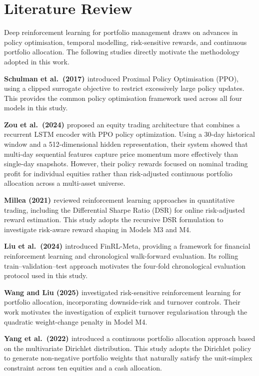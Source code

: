 \chapter{Literature Review}
\label{ch:lit_review}

Deep reinforcement learning for portfolio management draws on advances in policy optimisation, temporal modelling, risk-sensitive rewards, and continuous portfolio allocation. The following studies directly motivate the methodology adopted in this work.

\noindent\textbf{Schulman et al.\ (2017) \citep{schulman2017proximal}} introduced Proximal Policy Optimisation (PPO), using a clipped surrogate objective to restrict excessively large policy updates. This provides the common policy optimisation framework used across all four models in this study.

\noindent\textbf{Zou et al.\ (2024) \citep{zou2024novel}} proposed an equity trading architecture that combines a recurrent LSTM encoder with PPO policy optimization. Using a 30-day historical window and a 512-dimensional hidden representation, their system showed that multi-day sequential features capture price momentum more effectively than single-day snapshots. However, their policy rewards focused on nominal trading profit for individual equities rather than risk-adjusted continuous portfolio allocation across a multi-asset universe.

\noindent\textbf{Millea (2021) \citep{millea2021deep}} reviewed reinforcement learning approaches in quantitative trading, including the Differential Sharpe Ratio (DSR) for online risk-adjusted reward estimation. This study adopts the recursive DSR formulation to investigate risk-aware reward shaping in Models M3 and M4.

\noindent\textbf{Liu et al.\ (2024) \citep{liu2024dynamic}} introduced FinRL-Meta, providing a framework for financial reinforcement learning and chronological walk-forward evaluation. Its rolling train--validation--test approach motivates the four-fold chronological evaluation protocol used in this study.

\noindent\textbf{Wang and Liu (2025) \citep{wang2025risk}} investigated risk-sensitive reinforcement learning for portfolio allocation, incorporating downside-risk and turnover controls. Their work motivates the investigation of explicit turnover regularisation through the quadratic weight-change penalty in Model M4.

\noindent\textbf{Yang et al.\ (2022) \citep{yang2022selective}} introduced a continuous portfolio allocation approach based on the multivariate Dirichlet distribution. This study adopts the Dirichlet policy to generate non-negative portfolio weights that naturally satisfy the unit-simplex constraint across ten equities and a cash allocation.
